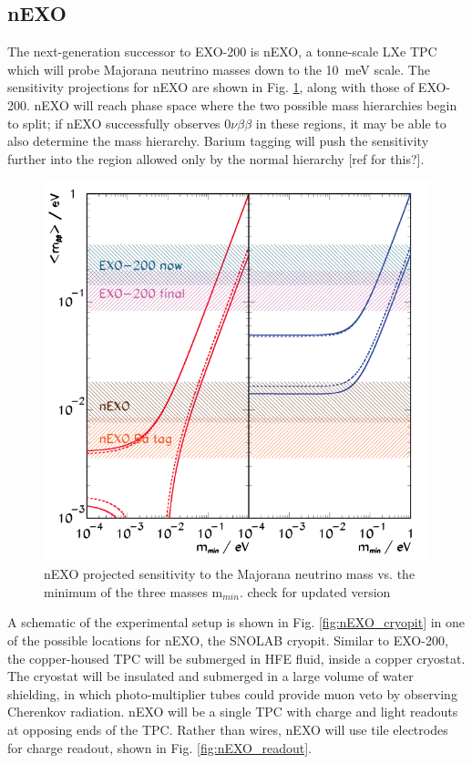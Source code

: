 \subsection{nEXO}

The next-generation successor to EXO-200 is nEXO, a tonne-scale LXe TPC which will probe Majorana neutrino masses down to the 10~meV scale.  The sensitivity projections for nEXO are shown in Fig. \ref{fig:sensitivity_nEXO}, along with those of EXO-200.  nEXO will reach phase space where the two possible mass hierarchies begin to split; if nEXO successfully observes $0\nu\beta\beta$ in these regions, it may be able to also determine the mass hierarchy.  Barium tagging will push the sensitivity further into the region allowed only by the normal hierarchy {\color{gray}[ref for this?]}.

\begin{figure} %
	\centering
	\includegraphics[width=.9\textwidth]{figures/sensitivity_v2.png}
	\caption{nEXO projected sensitivity to the Majorana neutrino mass vs. the minimum of the three masses m$_{min}$. {\color{red}check for updated version}}
\label{fig:sensitivity_nEXO}
\end{figure}

A schematic of the experimental setup is shown in Fig. \ref{fig:nEXO_cryopit} in one of the possible locations for nEXO, the SNOLAB cryopit.  Similar to EXO-200, the copper-housed TPC will be submerged in HFE fluid, inside a copper cryostat.  The cryostat will be insulated and submerged in a large volume of water shielding, in which photo-multiplier tubes could provide muon veto by observing Cherenkov radiation.  nEXO will be a single TPC with charge and light readouts at opposing ends of the TPC.  Rather than wires, nEXO will use tile electrodes for charge readout, shown in Fig. \ref{fig:nEXO_readout}.

